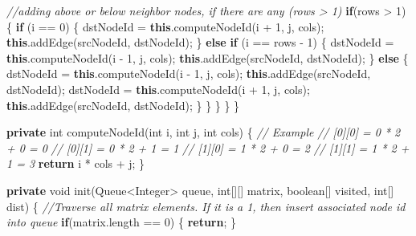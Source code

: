 \documentclass[]{book}
\newenvironment{Shaded}{\begin{snugshade}}{\end{snugshade}}
\newcommand{\BuiltInTok}[1]{#1}
\newcommand{\CommentTok}[1]{\textcolor[rgb]{0.56,0.35,0.01}{\textit{#1}}}
\newcommand{\DataTypeTok}[1]{\textcolor[rgb]{0.13,0.29,0.53}{#1}}
\newcommand{\DecValTok}[1]{\textcolor[rgb]{0.00,0.00,0.81}{#1}}
\newcommand{\FunctionTok}[1]{\textcolor[rgb]{0.00,0.00,0.00}{#1}}
\newcommand{\KeywordTok}[1]{\textcolor[rgb]{0.13,0.29,0.53}{\textbf{#1}}}
\newcommand{\NormalTok}[1]{#1}
\begin{document}
\begin{Shaded}
\begin{Highlighting}[]
                \CommentTok{//adding above or below neighbor nodes, if there are any (rows > 1)}
                \KeywordTok{if}\NormalTok{(rows > }\DecValTok{1}\NormalTok{) \{}
                    \KeywordTok{if}\NormalTok{ (i == }\DecValTok{0}\NormalTok{) \{}
\NormalTok{                        dstNodeId = }\KeywordTok{this}\NormalTok{.}\FunctionTok{computeNodeId}\NormalTok{(i + }\DecValTok{1}\NormalTok{, j, cols);}
                        \KeywordTok{this}\NormalTok{.}\FunctionTok{addEdge}\NormalTok{(srcNodeId, dstNodeId);}
\NormalTok{                    \} }\KeywordTok{else} \KeywordTok{if}\NormalTok{ (i == rows - }\DecValTok{1}\NormalTok{) \{}
\NormalTok{                        dstNodeId = }\KeywordTok{this}\NormalTok{.}\FunctionTok{computeNodeId}\NormalTok{(i - }\DecValTok{1}\NormalTok{, j, cols);}
                        \KeywordTok{this}\NormalTok{.}\FunctionTok{addEdge}\NormalTok{(srcNodeId, dstNodeId);}
\NormalTok{                    \} }\KeywordTok{else}\NormalTok{ \{}
\NormalTok{                        dstNodeId = }\KeywordTok{this}\NormalTok{.}\FunctionTok{computeNodeId}\NormalTok{(i - }\DecValTok{1}\NormalTok{, j, cols);}
                        \KeywordTok{this}\NormalTok{.}\FunctionTok{addEdge}\NormalTok{(srcNodeId, dstNodeId);}
\NormalTok{                        dstNodeId = }\KeywordTok{this}\NormalTok{.}\FunctionTok{computeNodeId}\NormalTok{(i + }\DecValTok{1}\NormalTok{, j, cols);}
                        \KeywordTok{this}\NormalTok{.}\FunctionTok{addEdge}\NormalTok{(srcNodeId, dstNodeId);}
\NormalTok{                    \}}
\NormalTok{                \}}
\NormalTok{            \}}
\NormalTok{        \}}
\NormalTok{    \}}

    \KeywordTok{private} \DataTypeTok{int} \FunctionTok{computeNodeId}\NormalTok{(}\DataTypeTok{int}\NormalTok{ i, }\DataTypeTok{int}\NormalTok{ j, }\DataTypeTok{int}\NormalTok{ cols) \{}
        \CommentTok{// Example}
        \CommentTok{// [0][0] = 0 * 2 + 0 = 0}
        \CommentTok{// [0][1] = 0 * 2 + 1 = 1}
        \CommentTok{// [1][0] = 1 * 2 + 0 = 2}
        \CommentTok{// [1][1] = 1 * 2 + 1 = 3}
        \KeywordTok{return}\NormalTok{ i * cols + j;}
\NormalTok{    \}}


    \KeywordTok{private} \DataTypeTok{void} \FunctionTok{init}\NormalTok{(}\BuiltInTok{Queue}\NormalTok{<}\BuiltInTok{Integer}\NormalTok{> queue, }\DataTypeTok{int}\NormalTok{[][] matrix, }\DataTypeTok{boolean}\NormalTok{[] visited, }\DataTypeTok{int}\NormalTok{[] dist) \{}
        \CommentTok{//Traverse all matrix elements. If it is a 1, then insert associated node id into queue}
        \KeywordTok{if}\NormalTok{(matrix.}\FunctionTok{length}\NormalTok{ == }\DecValTok{0}\NormalTok{) \{}
            \KeywordTok{return}\NormalTok{;}
\NormalTok{        \}}


\end{Highlighting}
\end{Shaded}
\end{document}
